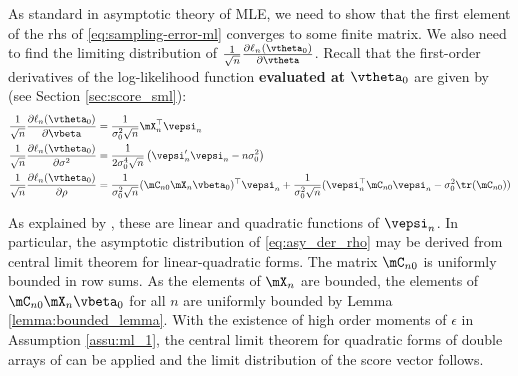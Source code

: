 \documentclass[english,12pt]{book}\usepackage[]{graphicx}\usepackage[]{xcolor}
\begin{document}
As standard in asymptotic theory of MLE, we need to show that the first element of the rhs of \eqref{eq:sampling-error-ml} converges to some finite matrix. We also need to find the limiting distribution of $\frac{1}{\sqrt{n}}\frac{\partial \ell_n(\vtheta_0)}{\partial \vtheta}$. Recall that the first-order derivatives of the log-likelihood function \textbf{evaluated at $\vtheta_0$} are given by (see Section \ref{sec:score_sml}):
\begin{align}
	\frac{1}{\sqrt{n}}\frac{\partial \ell_n(\vtheta_0)}{\partial \vbeta} & = \frac{1}{\sigma^2_0\sqrt{n}}\mX_n^\top\vepsi_n \\
	\frac{1}{\sqrt{n}}\frac{\partial \ell_n(\vtheta_0)}{\partial \sigma^2} & = \frac{1}{2\sigma_0^4\sqrt{n}}\left(\vepsi_n'\vepsi_n - n\sigma_0^2\right) \\
		\frac{1}{\sqrt{n}}\frac{\partial \ell_n(\vtheta_0)}{\partial \rho} & = \frac{1}{\sigma_0^2\sqrt{n}}(\mC_{n0}\mX_n\vbeta_0)^\top \vepsi_n + \frac{1}{\sigma_0^2\sqrt{n}}(\vepsi_n^\top\mC_{n0}\vepsi_n - \sigma_0^2\tr(\mC_{n0}))\label{eq:asy_der_rho}
\end{align}	

As explained by \citet[][pag. 1905]{lee2004asymptotic}, these are linear and quadratic functions of $\vepsi_n$. In particular, the asymptotic distribution of \eqref{eq:asy_der_rho} may be derived from central limit theorem for linear-quadratic forms. The matrix $\mC_{n0}$ is uniformly bounded in row sums. As the elements of $\mX_n$ are bounded, the elements of $\mC_{n0}\mX_n\vbeta_0$ for all $n$ are uniformly bounded by Lemma \ref{lemma:bounded_lemma}. With the existence of high order moments of $\epsilon$ in Assumption \ref{assu:ml_1}, the central limit theorem for quadratic forms of double arrays of \cite{kelejian2001asymptotic} can be applied and the limit distribution of the score vector follows.
\end{document}
